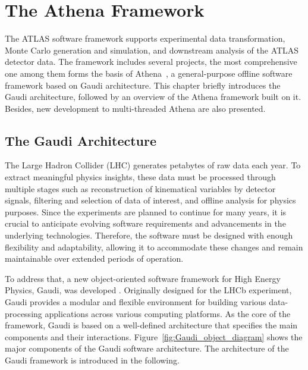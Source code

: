 \chapter{The Athena Framework} \label{ch:Athena}
The ATLAS software framework supports experimental data transformation, Monte Carlo generation and simulation, and downstream analysis of the ATLAS detector data. The framework includes several projects, the most comprehensive one among them forms the basis of Athena~\cite{ATLAScomputing2025}, a general-purpose offline software framework based on Gaudi architecture. This chapter briefly introduces the Gaudi architecture, followed by an overview of the Athena framework built on it. Besides, new development to multi-threaded Athena are also presented.
\section{The Gaudi Architecture} \label{sec:Gaudi}
The Large Hadron Collider (LHC) generates petabytes of raw data each year. To extract meaningful physics insights, these data must be processed through multiple stages such as reconstruction of kinematical variables by detector signals, filtering and selection of data of interest, and offline analysis for physics purposes. Since the experiments are planned to continue for many years, it is crucial to anticipate evolving software requirements and advancements in the underlying technologies. Therefore, the software must be designed with enough flexibility and adaptability, allowing it to accommodate these changes and remain maintainable over extended periods of operation.

To address that, a new object-oriented software framework for High Energy Physics, Gaudi, was developed \cite{Gaudi}. Originally designed for the LHCb experiment, Gaudi provides a modular and flexible environment for building various data-processing applications across various computing platforms. As the core of the framework, Gaudi is based on a well-defined architecture that specifies the main components and their interactions. Figure~\ref{fig:Gaudi_object_diagram} shows the major components of the Gaudi software architecture. The architecture of the Gaudi framework is introduced in the following.

